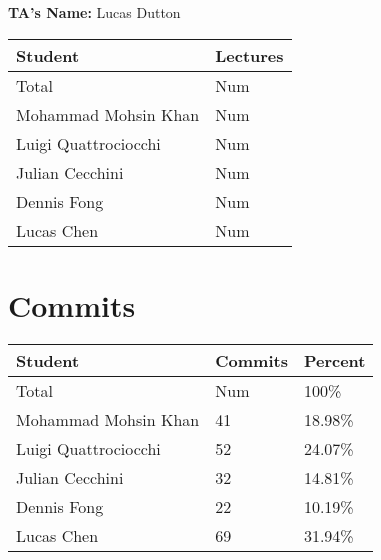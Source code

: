 \documentclass{article}
\begin{document}

\noindent \textbf{TA's Name: } Lucas Dutton

\begin{table}[H]
\centering
\begin{tabular}{ll}
\toprule
\textbf{Student} & \textbf{Lectures}\\
\midrule
Total & Num\\
Mohammad Mohsin Khan & Num\\
Luigi Quattrociocchi & Num\\
Julian Cecchini & Num\\
Dennis Fong & Num\\
Lucas Chen & Num\\
\bottomrule
\end{tabular}
\end{table}


\section{Commits}


\begin{table}[H]
\centering
\begin{tabular}{lll}
\toprule
\textbf{Student} & \textbf{Commits} & \textbf{Percent}\\
\midrule
Total & Num & 100\% \\
Mohammad Mohsin Khan & 41 & 18.98\% \\
Luigi Quattrociocchi & 52 & 24.07\% \\
Julian Cecchini & 32 & 14.81\% \\
Dennis Fong & 22 & 10.19\% \\
Lucas Chen & 69 & 31.94\% \\
\bottomrule
\end{tabular}
\end{table}

\end{document}

